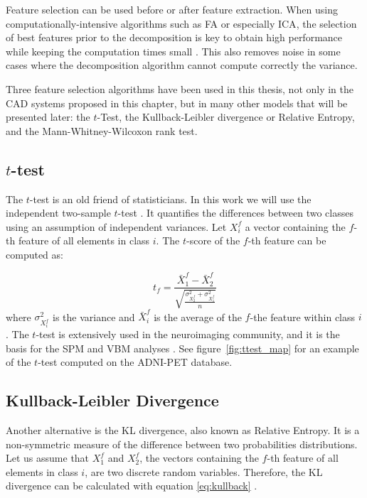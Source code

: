 Feature selection can be used before or after feature extraction. When using computationally-intensive algorithms such as \ac{FA} or especially \ac{ICA}, the selection of best features prior to the decomposition is key to obtain high performance while keeping the computation times small \cite{Martinez201141,Martinez-Murcia20129676}. This also removes noise in some cases where the decomposition algorithm cannot compute correctly the variance. 

Three feature selection algorithms have been used in this thesis, not only in the \ac{CAD} systems proposed in this chapter, but in many other models that will be presented later: the $t$-Test, the Kullback-Leibler divergence or Relative Entropy, and the Mann-Whitney-Wilcoxon rank test. 

\subsection{$t$-test}\label{sec:ttestEq}
The $t$-test is an old friend of statisticians. In this work we will use the independent two-sample $t$-test \cite{Fay10}. It quantifies the differences between two classes using an assumption of independent variances. Let $X_i^f$ a vector containing the $f$-th feature of all elements in class $i$. The $t$-score of the $f$-th feature can be computed as:

\begin{equation}
t_f = \frac{\bar{X}_1^f - \bar{X}_2^f}{\sqrt{\frac{\sigma_{X_2^f}^2+\sigma_{X_1^f}^2}{n}}}
\end{equation}
where $\sigma_{X_i^f}^2$ is the variance and $\bar{X}_i^f$ is the average of the $f$-the feature within class $i$. The $t$-test is extensively used in the neuroimaging community, and it is the basis for the \ac{SPM} and \ac{VBM} analyses \cite{spm_book}. See figure~\ref{fig:ttest_map} for an example of the $t$-test computed on the ADNI-PET database.

\subsection{Kullback-Leibler Divergence} 
Another alternative is the \acf{KL} divergence, also known as Relative Entropy. It is a non-symmetric measure of the difference between two probabilities distributions. Let us assume that $X_1^f$ and $X_2^f$, the vectors containing the $f$-th feature of all elements in class $i$, are two discrete random variables. Therefore, the \ac{KL} divergence can be calculated with equation \ref{eq:kullback} \cite{Theodoridis1999}.

